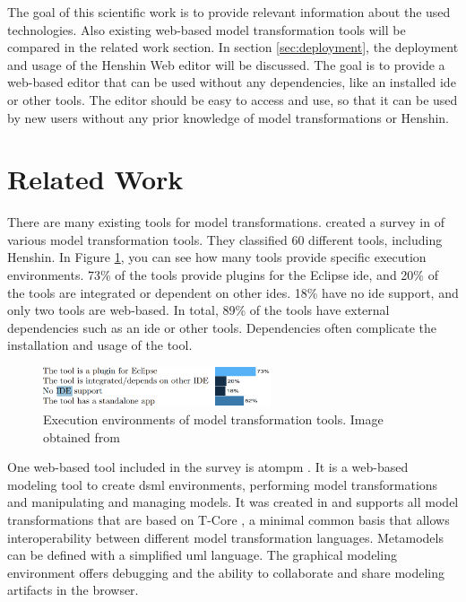\documentclass[conference,onecolumn]{IEEEtran}
\begin{document}
  The goal of this scientific work is to provide relevant information about the used technologies. Also existing web-based model transformation tools will be compared in the related work section. In section \ref{sec:deployment}, the deployment and usage of the Henshin Web editor will be discussed. The goal is to provide a web-based editor that can be used without any dependencies, like an installed \acs{ide} or other tools. The editor should be easy to access and use, so that it can be used by new users without any prior knowledge of model transformations or Henshin.

  

  \section{Related Work}
  \label{sec:related-work}

  There are many existing tools for model transformations. \citeauthor{kahani2019survey} created a survey in \citeyear{kahani2019survey} of various model transformation tools. They classified 60 different tools, including Henshin. In Figure \ref{fig:tools-environments}, you can see how many tools provide specific execution environments. 73\% of the tools provide plugins for the Eclipse \acs{ide}, and 20\% of the tools are integrated or dependent on other \acsp{ide}. 18\% have no \acs{ide} support, and only two tools are web-based. In total, 89\% of the tools have external dependencies such as an \acs{ide} or other tools. Dependencies often complicate the installation and usage of the tool. \cite{kahani2019survey}

  \begin{figure}[h]
    \centering
    \includegraphics[width=0.6\textwidth]{model-tools.png}
    \caption{Execution environments of model transformation tools. Image obtained from \cite{kahani2019survey}}
    \label{fig:tools-environments}
  \end{figure}

  One web-based tool included in the survey is \ac{atompm} \cite{atompm}. It is a web-based modeling tool to create \ac{dsml} environments, performing model transformations and manipulating and managing models. \cite{atompm} It was created in \citeyear{atompm} and supports all model transformations that are based on T-Core \cite{tcore}, a minimal common basis that allows interoperability between different model transformation languages. \cite{tcore} Metamodels can be defined with a simplified \acs{uml} language. The graphical modeling environment offers debugging and the ability to collaborate and share modeling artifacts in the browser. \cite{atompm}
\end{document}
